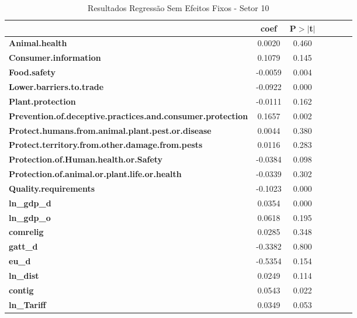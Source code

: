 \begin{table}[ht]
    \begin{center}
        \begin{tabular}{lcccccc}
            & \textbf{coef} & \textbf{P$> |$t$|$} \\
            \midrule
\textbf{Animal.health}                                             &       0.0020 &      0.460  \\
\textbf{Consumer.information}                                      &       0.1079 &      0.145  \\
\textbf{Food.safety}                                               &      -0.0059 &      0.004  \\
\textbf{Lower.barriers.to.trade}                                   &      -0.0922 &      0.000  \\
\textbf{Plant.protection}                                          &      -0.0111 &      0.162  \\
\textbf{Prevention.of.deceptive.practices.and.consumer.protection} &       0.1657 &      0.002  \\
\textbf{Protect.humans.from.animal.plant.pest.or.disease}          &       0.0044 &      0.380  \\
\textbf{Protect.territory.from.other.damage.from.pests}            &       0.0116 &      0.283  \\
\textbf{Protection.of.Human.health.or.Safety}                      &      -0.0384 &      0.098  \\
\textbf{Protection.of.animal.or.plant.life.or.health}              &      -0.0339 &      0.302  \\
\textbf{Quality.requirements}                                      &      -0.1023 &      0.000  \\
\textbf{ln\_gdp\_d}                                                &       0.0354 &      0.000  \\
\textbf{ln\_gdp\_o}                                                &       0.0618 &      0.195  \\
\textbf{comrelig}                                                  &       0.0285 &      0.348  \\
\textbf{gatt\_d}                                                   &      -0.3382 &      0.800  \\
\textbf{eu\_d}                                                     &      -0.5354 &      0.154  \\
\textbf{ln\_dist}                                                  &       0.0249 &      0.114  \\
\textbf{contig}                                                    &       0.0543 &      0.022  \\
\textbf{ln\_Tariff}                                                &       0.0349 &      0.053  \\
\bottomrule
\end{tabular}
\caption{Resultados Regressão Sem Efeitos Fixos - Setor 10}
\end{center}
\end{table}